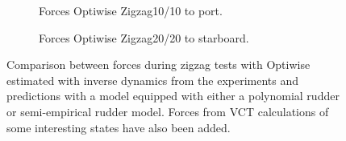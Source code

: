 \begin{figure}[h]
     \centering
     \begin{subfigure}[b]{\textwidth}
         \centering
         
        \caption{Forces Optiwise Zigzag10/10 to port.}
        \label{fig:ID_optiwise10}
     \end{subfigure}
     \vfill
     \begin{subfigure}[b]{\textwidth}
         
        \caption{Forces Optiwise Zigzag20/20 to starboard.}
        \label{fig:ID_optiwise_20}
     \end{subfigure}
        \caption{Comparison between forces during zigzag tests with Optiwise estimated with inverse dynamics from the experiments and predictions with a model equipped with either a polynomial rudder or semi-empirical rudder model. Forces from VCT calculations of some interesting states have also been added.}
        \label{fig:ID_optiwise}
\end{figure}